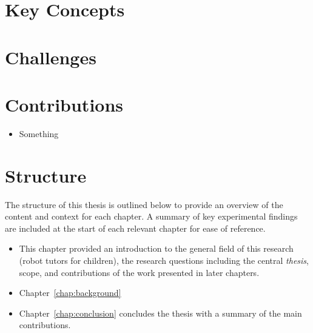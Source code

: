 \section{Key Concepts}\label{sec:intro-concepts}

\section{Challenges}

\section{Contributions}\label{sec:intro-contr}

\begin{itemize}
	\item Something 
\end{itemize}

\section{Structure}\label{sec:intro-struct}
The structure of this thesis is outlined below to provide an overview of the content and context for each chapter. A summary of key experimental findings are included at the start of each relevant chapter for ease of reference. 

\begin{itemize}
\item This chapter provided an introduction to the general field of this research (robot tutors for children), the research questions including the central \textit{thesis}, scope, and contributions of the work presented in later chapters.  

\item Chapter~\ref{chap:background} 



\item Chapter~\ref{chap:conclusion} concludes the thesis with a summary of the main contributions.

\end{itemize}
